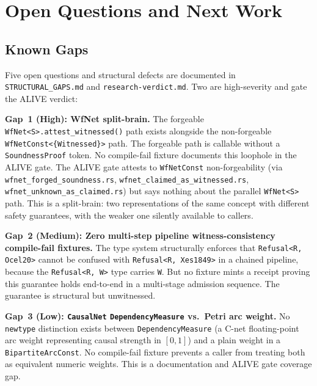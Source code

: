 
\section{Open Questions and Next Work}
\label{sec:sources-wasm4pm-compat-openquestions}

\subsection{Known Gaps}
\label{sec:sources-wasm4pm-compat-openquestions-gaps}

Five open questions and structural defects are documented in \texttt{STRUCTURAL\_GAPS.md}
and \texttt{research-verdict.md}. Two are high-severity and gate the ALIVE verdict:

\textbf{Gap~1 (High): WfNet split-brain.} The forgeable \texttt{WfNet<S>.attest\_witnessed()}
path exists alongside the non-forgeable \texttt{WfNetConst<\{Witnessed\}>} path. The
forgeable path is callable without a \texttt{SoundnessProof} token. No compile-fail
fixture documents this loophole in the ALIVE gate. The ALIVE gate attests to
\texttt{WfNetConst} non-forgeability (via \texttt{wfnet\_forged\_soundness.rs},
\texttt{wfnet\_claimed\_as\_witnessed.rs}, \texttt{wfnet\_unknown\_as\_claimed.rs})
but says nothing about the parallel \texttt{WfNet<S>} path. This is a split-brain: two
representations of the same concept with different safety guarantees, with the weaker
one silently available to callers.

\textbf{Gap~2 (Medium): Zero multi-step pipeline witness-consistency compile-fail fixtures.}
The type system structurally enforces that \texttt{Refusal<R, Ocel20>} cannot be confused
with \texttt{Refusal<R, Xes1849>} in a chained pipeline, because the \texttt{Refusal<R, W>}
type carries \texttt{W}. But no fixture mints a receipt proving this guarantee holds
end-to-end in a multi-stage admission sequence. The guarantee is structural but unwitnessed.

\textbf{Gap~3 (Low): \texttt{CausalNet} \texttt{DependencyMeasure} vs.\ Petri arc weight.}
No \texttt{newtype} distinction exists between \texttt{DependencyMeasure} (a C-net
floating-point arc weight representing causal strength in $[0,1]$) and a plain weight in
a \texttt{BipartiteArcConst}. No compile-fail fixture prevents a caller from treating
both as equivalent numeric weights. This is a documentation and ALIVE gate coverage gap.

